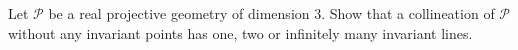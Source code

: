 Let $\mathcal{P}$ be a real projective geometry of dimension 3. Show that a collineation of $\mathcal{P}$ without any invariant points has one, two or infinitely many invariant lines.
